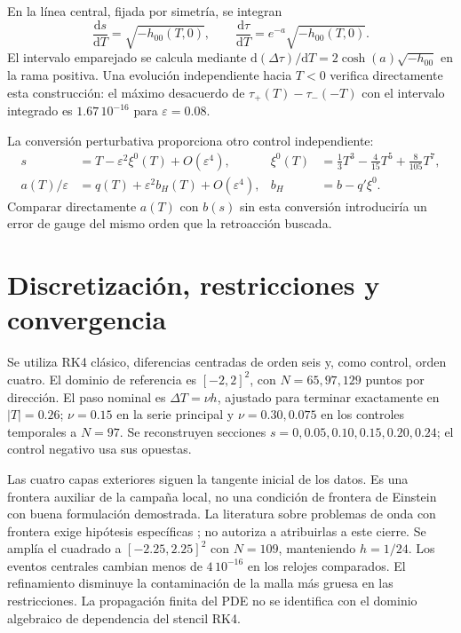 \documentclass[11pt,a4paper]{article}
\newcommand{\eps}{\varepsilon}
\newcommand{\dd}{\mathrm d}
\begin{document}
En la línea central, fijada por simetría, se integran
\begin{equation}
 \frac{\dd s}{\dd T}=\sqrt{-h_{00}(T,0)},\qquad
 \frac{\dd\tau}{\dd T}=e^{-a}\sqrt{-h_{00}(T,0)}.
\end{equation}
El intervalo emparejado se calcula mediante
$\dd(\Delta\tau)/\dd T=2\cosh(a)\sqrt{-h_{00}}$ en la rama positiva. Una evolución independiente hacia $T<0$ verifica directamente esta construcción: el máximo desacuerdo de $\tau_+(T)-\tau_-(-T)$ con el intervalo integrado es $1.67\,10^{-16}$ para $\eps=0.08$.

La conversión perturbativa proporciona otro control independiente:
\begin{align}
 s&=T-\eps^2\xi^0(T)+O(\eps^4),&
 \xi^0(T)&=\tfrac13T^3-\tfrac4{15}T^5+\tfrac8{105}T^7,\\
 a(T)/\eps&=q(T)+\eps^2b_H(T)+O(\eps^4),&
 b_H&=b-q'\xi^0.
\end{align}
Comparar directamente $a(T)$ con $b(s)$ sin esta conversión introduciría un error de gauge del mismo orden que la retroacción buscada.

\section{Discretización, restricciones y convergencia}
Se utiliza RK4 clásico, diferencias centradas de orden seis y, como control, orden cuatro. El dominio de referencia es $[-2,2]^2$, con $N=65,97,129$ puntos por dirección. El paso nominal es $\Delta T=\nu h$, ajustado para terminar exactamente en $|T|=0.26$; $\nu=0.15$ en la serie principal y $\nu=0.30,0.075$ en los controles temporales a $N=97$. Se reconstruyen secciones $s=0,0.05,0.10,0.15,0.20,0.24$; el control negativo usa sus opuestas.

Las cuatro capas exteriores siguen la tangente inicial de los datos. Es una frontera auxiliar de la campaña local, no una condición de frontera de Einstein con buena formulación demostrada. La literatura sobre problemas de onda con frontera exige hipótesis específicas \cite{Kreiss}; no autoriza a atribuirlas a este cierre. Se amplía el cuadrado a $[-2.25,2.25]^2$ con $N=109$, manteniendo $h=1/24$. Los eventos centrales cambian menos de $4\,10^{-16}$ en los relojes comparados. El refinamiento disminuye la contaminación de la malla más gruesa en las restricciones. La propagación finita del PDE no se identifica con el dominio algebraico de dependencia del stencil RK4.
\end{document}
